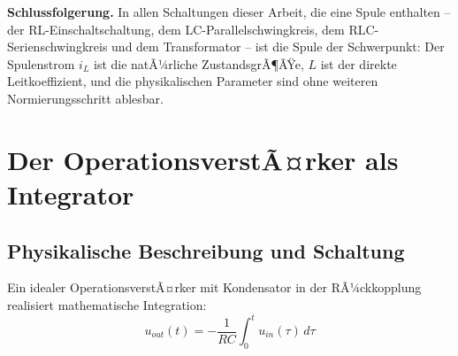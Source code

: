 ﻿\documentclass[12pt, a4paper]{article}
\begin{document}
	\textbf{Schlussfolgerung.}
	In allen Schaltungen dieser Arbeit, die eine Spule enthalten -- der RL-Einschalt\-schaltung,
	dem LC-Parallelschwingkreis, dem RLC-Serienschwingkreis und dem Transformator --
	ist die Spule der Schwerpunkt: Der Spulenstrom $i_L$ ist die natÃ¼rliche
	ZustandsgrÃ¶ÃŸe, $L$ ist der direkte Leitkoeffizient, und die physikalischen
	Parameter sind ohne weiteren Normierungsschritt ablesbar.
	
	\section{Der OperationsverstÃ¤rker als Integrator}
	
	\subsection{Physikalische Beschreibung und Schaltung}
	
	Ein idealer OperationsverstÃ¤rker mit Kondensator in der RÃ¼ckkopplung realisiert mathematische Integration:
	\begin{equation}
		u_{out}(t) = -\frac{1}{RC} \int_0^t u_{in}(\tau)\, d\tau
	\end{equation}
	
\end{document}
